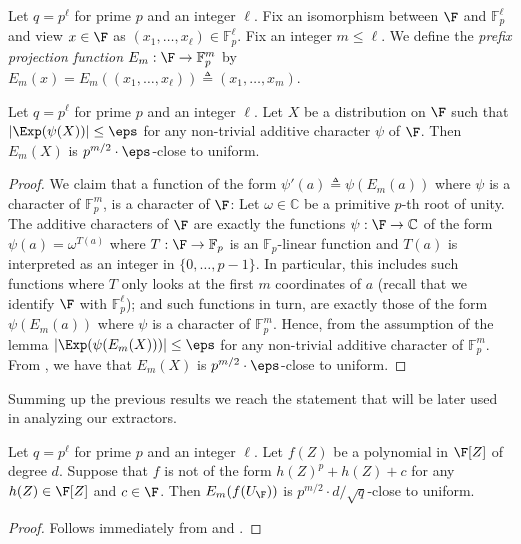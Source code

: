 \begin{definition}\label{dfn-prefix_function}
Let $q=p^{\ell}$ for prime $p$ and an integer $\ell$.
Fix an isomorphism between $\F$ and $\mathbb{F}_p^{\ell}$
and view $x\in \F$ as $(x_1,\ldots,x_{\ell})\in \mathbb{F}_p^{\ell}$.
Fix an integer $m\leq \ell$. We define the \emph{prefix projection function}
$E_m:\F \to \mathbb{F}_p^m$ by $E_m(x) = E_m( (x_1,\ldots,x_{\ell})) \triangleq (x_1,\ldots,x_m)$.
\end{definition}
\begin{lemma}\label{lem-bits_from_small_bias}
Let $q=p^{\ell}$ for prime $p$ and an integer $\ell$.
 Let $X$ be a distribution on $\F$ such that
 $|\Exp(\psi(X))|\leq \eps$ for any
 non-trivial additive character $\psi$ of $\F$.
 Then  $E_m(X)$ is $p^{m/2}\cdot \eps$-close to uniform.
\end{lemma}
\begin{proof}
We claim that a function of the form $\psi'(a)\triangleq \psi(E_m(a))$ where
$\psi$ is a character of $\mathbb{F}_p^m$, is a character of $\F$:
Let $\omega \in \mathbb{C}$ be a primitive
%
$p$-th root of unity.
The additive characters of $\F$ are exactly the functions
$\psi:\F\to \mathbb{C}$ of the form $\psi(a)=  \omega^ {T(a)}$
where $T:\F\to \mathbb{F}_p$ is an $\mathbb{F}_p$-linear
function and $T(a)$ is interpreted as an integer in
$\{0,\ldots,p-1\}$. In particular, this includes such functions where $T$ only looks
at the first $m$ coordinates of $a$ (recall that we identify $\F$ with
$\mathbb{F}_p^{\ell}$);
and such functions in turn, are exactly those of the form
$\psi(E_m(a))$ where
$\psi$ is a character of $\mathbb{F}_p^m$.
Hence, from the assumption of the lemma $|\Exp(\psi(E_m(X)))|\leq
\eps$ for any non-trivial additive character of  $\mathbb{F}_p^m$.
{}From , we have that $E_m(X)$ is $p^{m/2}\cdot
\eps$-close to uniform.

\end{proof}

Summing up the previous results we reach the statement that will be later used in analyzing our extractors.

\begin{corollary}\label{cor-bits_from_weil}
Let $q=p^{\ell}$ for prime $p$ and an integer $\ell$.
Let $f(Z)$ be a polynomial in $\F[Z]$ of
degree $d$. Suppose that $f$ is not of the form $h(Z)^p + h(Z) + c$ for any $h(Z)\in \F[Z]$ and $c\in \F$.
Then $E_m(f(U_{\F}))$ is $p^{m/2}\cdot d/\sqrt q$-close to uniform.
\end{corollary}
\begin{proof}
Follows immediately from 
and .
\end{proof}




